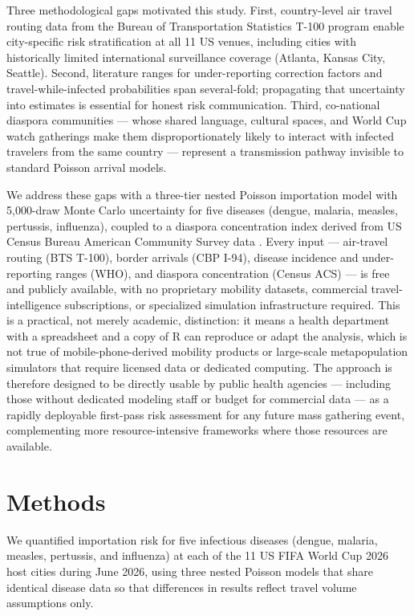 \documentclass[12pt, a4paper]{article}
\begin{document}
Three methodological gaps motivated this study. First, country-level air travel routing data from the Bureau of Transportation Statistics T-100 program enable city-specific risk stratification at all 11 US venues, including cities with historically limited international surveillance coverage (Atlanta, Kansas City, Seattle). Second, literature ranges for under-reporting correction factors and travel-while-infected probabilities span several-fold; propagating that uncertainty into estimates is essential for honest risk communication. Third, co-national diaspora communities --- whose shared language, cultural spaces, and World Cup watch gatherings make them disproportionately likely to interact with infected travelers from the same country --- represent a transmission pathway invisible to standard Poisson arrival models.

We address these gaps with a three-tier nested Poisson importation model with 5,000-draw Monte Carlo uncertainty for five diseases (dengue, malaria, measles, pertussis, influenza), coupled to a diaspora concentration index derived from US Census Bureau American Community Survey data \citep{Census2026WC, tidycensus}. Every input --- air-travel routing (BTS T-100), border arrivals (CBP I-94), disease incidence and under-reporting ranges (WHO), and diaspora concentration (Census ACS) --- is free and publicly available, with no proprietary mobility datasets, commercial travel-intelligence subscriptions, or specialized simulation infrastructure required. This is a practical, not merely academic, distinction: it means a health department with a spreadsheet and a copy of R can reproduce or adapt the analysis, which is not true of mobile-phone-derived mobility products or large-scale metapopulation simulators that require licensed data or dedicated computing. The approach is therefore designed to be directly usable by public health agencies --- including those without dedicated modeling staff or budget for commercial data --- as a rapidly deployable first-pass risk assessment for any future mass gathering event, complementing more resource-intensive frameworks where those resources are available.

\section{Methods}

We quantified importation risk for five infectious diseases (dengue, malaria, measles, pertussis, and influenza) at each of the 11 US FIFA World Cup 2026 host cities during June 2026, using three nested Poisson models that share identical disease data so that differences in results reflect travel volume assumptions only.
\end{document}
